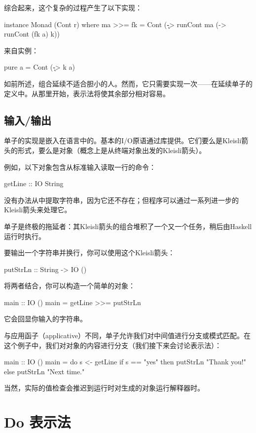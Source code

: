 \documentclass[DaoFP]{subfiles}
\begin{document}
综合起来，这个复杂的过程产生了以下实现：
\begin{haskell}
instance Monad (Cont r) where
  ma >>= fk = Cont (\k -> runCont ma (\a -> runCont (fk a) k))
\end{haskell}
来自实例：
\begin{haskell}
  pure a = Cont (\k -> k a)
\end{haskell}
如前所述，组合延续不适合胆小的人。然而，它只需要实现一次——在延续单子的定义中。从那里开始，表示法将使其余部分相对容易。

\subsection{输入/输出}

单子的实现是嵌入在语言中的。基本的I/O原语通过库提供。它们要么是Kleisli箭头的形式，要么是对象（概念上是从终端对象\hask{()}出发的Kleisli箭头）。

例如，以下对象包含从标准输入读取一行的命令：
\begin{haskell}
getLine :: IO String
\end{haskell}
没有办法从中提取字符串，因为它还不存在；但程序可以通过一系列进一步的Kleisli箭头来处理它。

单子是终极的拖延者：其Kleisli箭头的组合堆积了一个又一个任务，稍后由Haskell运行时执行。

要输出一个字符串并换行，你可以使用这个Kleisli箭头：
\begin{haskell}
putStrLn :: String -> IO ()
\end{haskell}
将两者结合，你可以构造一个简单的对象：
\begin{haskell}
main :: IO ()
main = getLine >>= putStrLn
\end{haskell}
它会回显你输入的字符串。

与应用函子（applicative）不同，单子允许我们对中间值进行分支或模式匹配。在这个例子中，我们对对象的内容进行分支（我们接下来会讨论表示法）：
\begin{haskell}
main :: IO ()
main = do
  s <- getLine
  if s == "yes"
  then putStrLn "Thank you!"
  else putStrLn "Next time."
\end{haskell}
当然，实际的值检查会推迟到运行时对生成的对象运行解释器时。

\section{Do 表示法}
\end{document}
